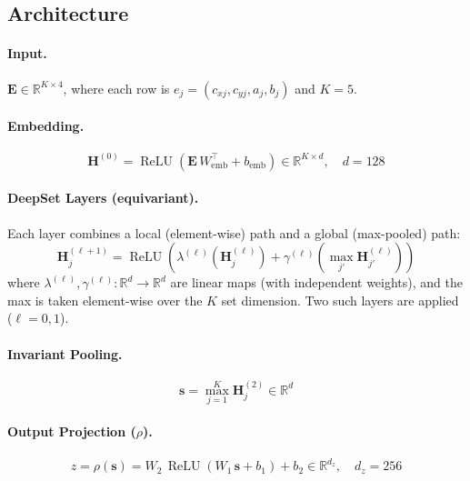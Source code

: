 \documentclass{article}
\newcommand{\ReLU}{\operatorname{ReLU}}
\newcommand{\R}{\mathbb{R}}
\begin{document}
\subsection{Architecture}

\paragraph{Input.} $\mathbf{E} \in \R^{K \times 4}$, where each row is
$e_j = (c_{xj}, c_{yj}, a_j, b_j)$ and $K=5$.

\paragraph{Embedding.}
\begin{equation}
    \mathbf{H}^{(0)} = \ReLU\!\left(\mathbf{E}\,W_{\mathrm{emb}}^\top + b_{\mathrm{emb}}\right)
    \in \R^{K \times d}, \quad d = 128
\end{equation}

\paragraph{DeepSet Layers (equivariant).}
Each layer combines a local (element-wise) path and a global (max-pooled) path:
\begin{equation}
    \mathbf{H}^{(\ell+1)}_j = \ReLU\!\left(
        \lambda^{(\ell)}\!\left(\mathbf{H}^{(\ell)}_j\right)
        + \gamma^{(\ell)}\!\left(\max_{j'} \mathbf{H}^{(\ell)}_{j'}\right)
    \right)
\end{equation}
where $\lambda^{(\ell)}, \gamma^{(\ell)} : \R^d \to \R^d$ are linear maps
(with independent weights), and the max is taken element-wise over the $K$
set dimension. Two such layers are applied ($\ell = 0, 1$).

\paragraph{Invariant Pooling.}
\begin{equation}
    \mathbf{s} = \max_{j=1}^{K} \mathbf{H}^{(2)}_j \in \R^d
\end{equation}

\paragraph{Output Projection ($\rho$).}
\begin{equation}
    z = \rho(\mathbf{s}) = W_2\,\ReLU\!\left(W_1\,\mathbf{s} + b_1\right) + b_2
    \in \R^{d_z}, \quad d_z = 256
\end{equation}
\end{document}
